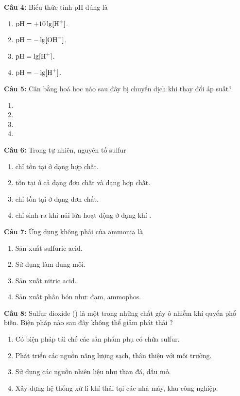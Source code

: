\documentclass[10.5pt,a4paper]{article}
\begin{document}
\textbf{Câu 4:} Biểu thức tính pH đúng là
\begin{enumerate}[label=\textbf{\Alph*.}, itemsep=1pt, topsep=1pt, leftmargin=1.5cm]
    \item $\text{pH} = +10 \lg[\ce{H+}]$. \hfill \item $\text{pH} = -\lg[\ce{OH-}]$. \hfill \item $\text{pH} = \lg[\ce{H+}]$. \hfill \item $\text{pH} = -\lg[\ce{H+}]$.
\end{enumerate}

\textbf{Câu 5:} Cân bằng hoá học nào sau đây bị chuyển dịch khi thay đổi áp suất?
\begin{enumerate}[label=\textbf{\Alph*.}, itemsep=1pt, topsep=1pt, leftmargin=1.5cm]
    \item {}
    \item {}
    \item {}
    \item {}
\end{enumerate}

\textbf{Câu 6:} Trong tự nhiên, nguyên tố sulfur
\begin{enumerate}[label=\textbf{\Alph*.}, itemsep=1pt, topsep=1pt, leftmargin=1.5cm]
    \item chỉ tồn tại ở dạng hợp chất. \hfill \item tồn tại ở cả dạng đơn chất và dạng hợp chất.
    \item chỉ tồn tại ở dạng đơn chất. \hfill \item chỉ sinh ra khi núi lửa hoạt động ở dạng khí .
\end{enumerate}

\textbf{Câu 7:} Ứng dụng không phải của ammonia là
\begin{enumerate}[label=\textbf{\Alph*.}, itemsep=1pt, topsep=1pt, leftmargin=1.5cm]
    \item Sản xuất sulfuric acid. \hfill \item Sử dụng làm dung môi.
    \item Sản xuất nitric acid. \hfill \item Sản xuất phân bón như: đạm, ammophos.
\end{enumerate}

\textbf{Câu 8:} Sulfur dioxide () là một trong những chất gây ô nhiễm khí quyển phổ biến. Biện pháp nào sau đây không thể giảm phát thải ?
\begin{enumerate}[label=\textbf{\Alph*.}, itemsep=1pt, topsep=1pt, leftmargin=1.5cm]
    \item Có biện pháp tái chế các sản phẩm phụ có chứa sulfur.
    \item Phát triển các nguồn năng lượng sạch, thân thiện với môi trường.
    \item Sử dụng các nguồn nhiên liệu như than đá, dầu mỏ.
    \item Xây dựng hệ thống xử lí khí thải tại các nhà máy, khu công nghiệp.
\end{enumerate}
\end{document}
